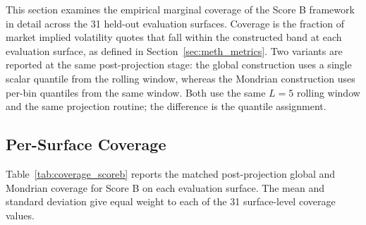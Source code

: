 This section examines the empirical marginal coverage of the Score B framework in detail across the 31 held-out evaluation surfaces. Coverage is the fraction of market implied volatility quotes that fall within the constructed band at each evaluation surface, as defined in Section~\ref{sec:meth_metrics}. Two variants are reported at the same post-projection stage: the global construction uses a single scalar quantile from the rolling window, whereas the Mondrian construction uses per-bin quantiles from the same window. Both use the same $L=5$ rolling window and the same projection routine; the difference is the quantile assignment.

\subsection{Per-Surface Coverage}
\label{subsec:exp_coverage_persurface}

Table~\ref{tab:coverage_scoreb} reports the matched post-projection global and Mondrian coverage for Score B on each evaluation surface. The mean and standard deviation give equal weight to each of the 31 surface-level coverage values.

